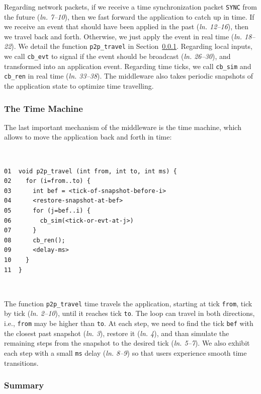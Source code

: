 \documentclass[10pt,journal,compsoc]{IEEEtran}
\newcommand{\code}[1]  {\texttt{\small{#1}}}
\newcommand{\lin}[1]{(\emph{ln. #1}\xspace)}
\begin{document}
Regarding network packets, if we receive a time synchronization packet
\code{SYNC} from the future \lin{7--10}, then we fast forward the application
to catch up in time. %
If we receive an event that should have been applied in the past \lin{12--16},
then we travel back and forth. %
Otherwise, we just apply the event in real time \lin{18--22}.
We detail the function \code{p2p\_travel} in
Section~\ref{sec.tml.middleware.travel}.
%
Regarding local inputs, we call \code{cb\_evt} to signal if the event should be
broadcast \lin{26--30}, and transformed into an application event.
%
Regarding time ticks, we call \code{cb\_sim} and \code{cb\_ren} in real time
\lin{33--38}.
The middleware also takes periodic snapshots of the application state to
optimize time travelling. %

\subsubsection{The Time Machine}
\label{sec.tml.middleware.travel}

The last important mechanism of the middleware is the time machine, which
allows to move the application back and forth in time:

{\footnotesize
~
\begin{verbatim}
01  void p2p_travel (int from, int to, int ms) {
02    for (i=from..to) {
03      int bef = <tick-of-snapshot-before-i>
04      <restore-snapshot-at-bef>
05      for (j=bef..i) {
06        cb_sim(<tick-or-evt-at-j>)
07      }
08      cb_ren();
09      <delay-ms>
10    }
11  }
\end{verbatim}
~
}

The function \code{p2p\_travel} time travels the application, starting at tick
\code{from}, tick by tick \lin{2--10}, until it reaches tick \code{to}.
The loop can travel in both directions, i.e., \code{from} may be higher than
\code{to}.
At each step, we need to find the tick \code{bef} with the closest past
snapshot \lin{3}, restore it \lin{4}, and than simulate the remaining steps
from the snapshot to the desired tick \lin{5--7}.
We also exhibit each step with a small \code{ms} delay \lin{8--9} so that users
experience smooth time transitions.

\subsubsection{Summary}
\label{sec.tml.middleware.summary}
\end{document}
